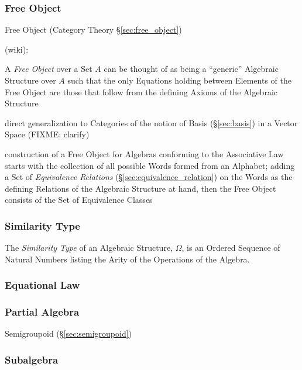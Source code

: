 \subsubsection{Free Object}\label{sec:universal_free_object}

\fist Free Object (Category Theory \S\ref{sec:free_object})

(wiki):

A \emph{Free Object} over a Set $A$ can be thought of as being a ``generic''
Algebraic Structure over $A$ such that the only Equations holding between
Elements of the Free Object are those that follow from the defining Axioms of
the Algebraic Structure

direct generalization to Categories of the notion of Basis (\S\ref{sec:basis})
in a Vector Space (FIXME: clarify)

construction of a Free Object for Algebras conforming to the Associative Law
starts with the collection of all possible Words formed from an Alphabet;
adding a Set of \emph{Equivalence Relations} (\S\ref{sec:equivalence_relation})
on the Words as the defining Relations of the Algebraic Structure at hand, then
the Free Object consists of the Set of Equivalence Classes



\subsubsection{Similarity Type}\label{sec:similarity_type}

The \emph{Similarity Type} of an Algebraic Structure, $\Omega$, is an
Ordered Sequence of Natural Numbers listing the Arity of the
Operations of the Algebra.



\subsubsection{Equational Law}\label{sec:equational_law}

\subsubsection{Partial Algebra}\label{sec:partial_algebra}

Semigroupoid (\S\ref{sec:semigroupoid})



\subsubsection{Subalgebra}\label{sec:subalgebra}

